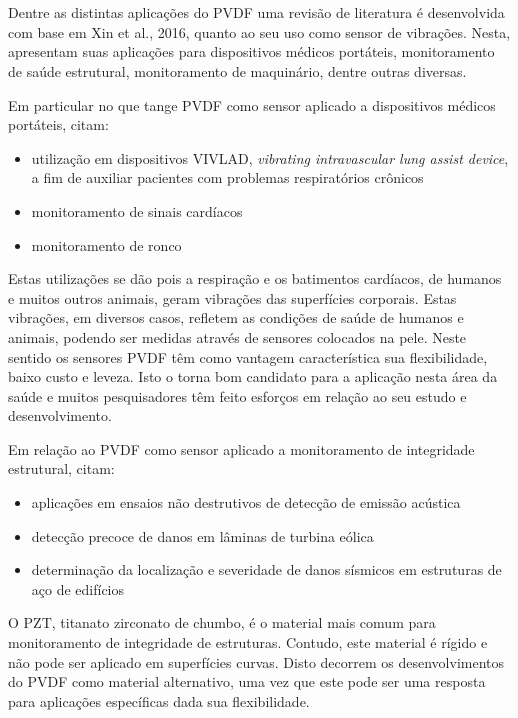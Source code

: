\documentclass[
	12pt,				
	oneside,			
	a4paper,			
	english,			
	brazil,			
	]{abntex2ppgsi}
\begin{document}
\section{}

Dentre as distintas aplicações do PVDF uma revisão de literatura é desenvolvida com base em Xin et al., 2016, quanto ao seu uso como sensor de vibrações. Nesta, apresentam suas aplicações para dispositivos médicos portáteis, monitoramento de saúde estrutural, monitoramento de maquinário, dentre outras diversas.

Em particular no que tange PVDF como sensor aplicado a dispositivos médicos portáteis, citam:

\begin{itemize}
	\item utilização em dispositivos VIVLAD, \textit{vibrating intravascular lung assist device}, a fim de auxiliar pacientes com problemas respiratórios crônicos 
	\item monitoramento de sinais cardíacos 
	\item monitoramento de ronco 
\end{itemize}

Estas utilizações se dão pois a respiração e os batimentos cardíacos, de humanos e muitos outros animais, geram vibrações das superfícies corporais. Estas vibrações, em diversos casos, refletem as condições de saúde de humanos e animais, podendo ser medidas através de sensores colocados na pele. Neste sentido os sensores PVDF têm como vantagem característica sua flexibilidade, baixo custo e leveza. Isto o torna bom candidato para a aplicação nesta área da saúde e muitos pesquisadores têm feito esforços em relação ao seu estudo e desenvolvimento.

Em relação ao PVDF como sensor aplicado a monitoramento de integridade estrutural, citam:

\begin{itemize}
	\item aplicações em ensaios não destrutivos de detecção de emissão acústica
	\item detecção precoce de danos em lâminas de turbina eólica 
	\item determinação da localização e severidade de danos sísmicos em estruturas de aço de edifícios
\end{itemize}

O PZT, titanato zirconato de chumbo, é o material mais comum para monitoramento de integridade de estruturas. Contudo, este material é rígido e não pode ser aplicado em superfícies curvas. Disto decorrem os desenvolvimentos do PVDF como material alternativo, uma vez que este pode ser uma resposta para aplicações específicas dada sua flexibilidade.
\end{document}
